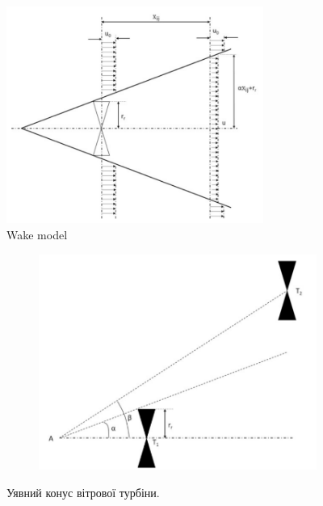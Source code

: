 \documentclass{beamer}
\begin{document}
    \begin{frame}
        \begin{figure}[h!]
            \centering
            \includegraphics[width=0.75\textwidth]{Pictures/Wake model.png}
            \caption{Wake model}
        \end{figure}
    \end{frame}

    \begin{frame}
        \begin{figure}[h!]
            \centering
            \begin{subfigure}[t]{0.75\textwidth}
                \centering
                \includegraphics[width=\textwidth]{Pictures/Imaginary cone of a wind turbine.png}
            \end{subfigure}
            \caption{Уявний конус вітрової турбіни.}
            \label{fig:Imaginary_cone_wind_turbine}
        \end{figure}        
    \end{frame}
\end{document}
